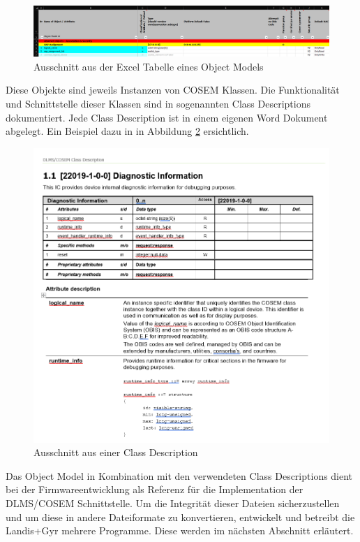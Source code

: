 \begin{figure}[H]
   \centering
   \includegraphics[width=1.0\textwidth]{gfx/objectModel.png}
   \caption{
       Ausschnitt aus der Excel Tabelle eines Object Models
   }
   \label{fig:objectModel}
\end{figure}

Diese Objekte sind jeweils Instanzen von \ac{COSEM} Klassen.
Die Funktionalität und Schnittstelle dieser Klassen sind in sogenannten Class Descriptions dokumentiert.
Jede Class Description ist in einem eigenen Word Dokument abgelegt.
Ein Beispiel dazu in in Abbildung \ref{fig:classDescription} ersichtlich.

\begin{figure}[H]
   \centering
   \includegraphics[width=1.0\textwidth]{gfx/ClassDescription.png}
   \caption{
       Ausschnitt aus einer Class Description
   }
   \label{fig:classDescription}
\end{figure}

Das Object Model in Kombination mit den verwendeten Class Descriptions dient bei der Firmwareentwicklung als Referenz für die Implementation der \ac{DLMS}/\ac{COSEM} Schnittstelle.
Um die Integrität dieser Dateien sicherzustellen und um diese in andere Dateiformate zu konvertieren, entwickelt und betreibt die Landis+Gyr mehrere Programme.
Diese werden im nächsten Abschnitt erläutert.

